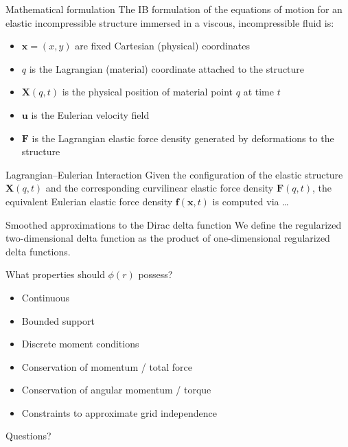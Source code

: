\documentclass{beamer}
\begin{document}
\begin{frame}{Mathematical formulation}
\small
The IB formulation of the equations of motion for an elastic incompressible
structure immersed in a viscous, incompressible fluid is:

\medskip
\begin{itemize}
    \item $\mathbf{x}=(x,y)$ are fixed Cartesian (physical) coordinates
    \item $q$ is the Lagrangian (material) coordinate attached to the structure
    \item $\mathbf{X}(q,t)$ is the physical position of material point $q$ at time $t$
    \item $\mathbf{u}$ is the Eulerian velocity field
    \item $\mathbf{F}$ is the Lagrangian elastic force density generated by deformations to the structure
\end{itemize}

\end{frame}

\begin{frame}{Lagrangian--Eulerian Interaction}
\small
Given the configuration of the elastic structure $\mathbf{X}(q,t)$ and the corresponding
curvilinear elastic force density $\mathbf{F}(q,t)$, the equivalent Eulerian elastic force
density $\mathbf{f}(\mathbf{x},t)$ is computed via \dots

\medskip

\end{frame}

\begin{frame}{Smoothed approximations to the Dirac delta function}
\small
We define the regularized two-dimensional delta function as the product
of one-dimensional regularized delta functions.

\medskip
What properties should $\phi(r)$ possess?
\begin{itemize}
    \item Continuous
    \item Bounded support
    \item Discrete moment conditions
    \item Conservation of momentum / total force
    \item Conservation of angular momentum / torque
    \item Constraints to approximate grid independence
\end{itemize}

\end{frame}

\begin{frame}
\centering
\Large Questions?
\end{frame}
\end{document}
